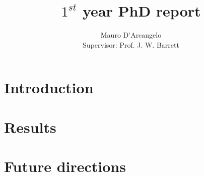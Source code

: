 \documentclass[12pt,a4paper]{article}
\title{$1^{st}$ year PhD report}
\author{Mauro D'Arcangelo \\ Supervisor: Prof. J. W. Barrett}
\date{}
\begin{document}
\maketitle


\tableofcontents

\section{Introduction}\label{intro}


\section{Results}\label{results}



\section{Future directions}\label{future}





\end{document}
